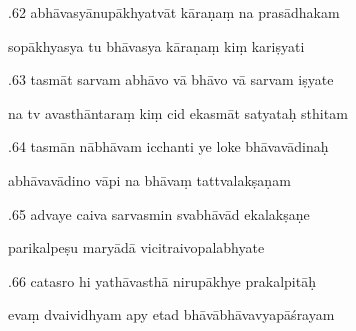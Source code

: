 \documentclass[article,12pt,a4paper]{memoir}%
\newcounter{parCount}
\begin{document}
	  
	  \pstart {}.62 abhāvasyānupākhyatvāt kāraṇaṃ na prasādhakam 
	{}
	\pend%
      

	  
	  \pstart \leavevmode%
	sopākhyasya tu bhāvasya kāraṇaṃ kiṃ kariṣyati 
	{}
	\pend%
      

	  
	  \pstart {}.63 tasmāt sarvam abhāvo vā bhāvo vā sarvam iṣyate 
	{}
	\pend%
      

	  
	  \pstart \leavevmode%
	na tv avasthāntaraṃ kiṃ cid ekasmāt satyataḥ sthitam 
	{}
	\pend%
      

	  
	  \pstart {}.64 tasmān nābhāvam icchanti ye loke bhāvavādinaḥ 
	{}
	\pend%
      

	  
	  \pstart \leavevmode%
	abhāvavādino vāpi na bhāvaṃ tattvalakṣaṇam 
	{}
	\pend%
      

	  
	  \pstart {}.65 advaye caiva sarvasmin svabhāvād ekalakṣaṇe 
	{}
	\pend%
      

	  
	  \pstart \leavevmode%
	parikalpeṣu maryādā vicitraivopalabhyate 
	{}
	\pend%
      

	  
	  \pstart {}.66 catasro hi yathāvasthā nirupākhye prakalpitāḥ 
	{}
	\pend%
      

	  
	  \pstart \leavevmode%
	evaṃ dvaividhyam apy etad bhāvābhāvavyapāśrayam 
	{}
	\pend%
      
\end{document}
